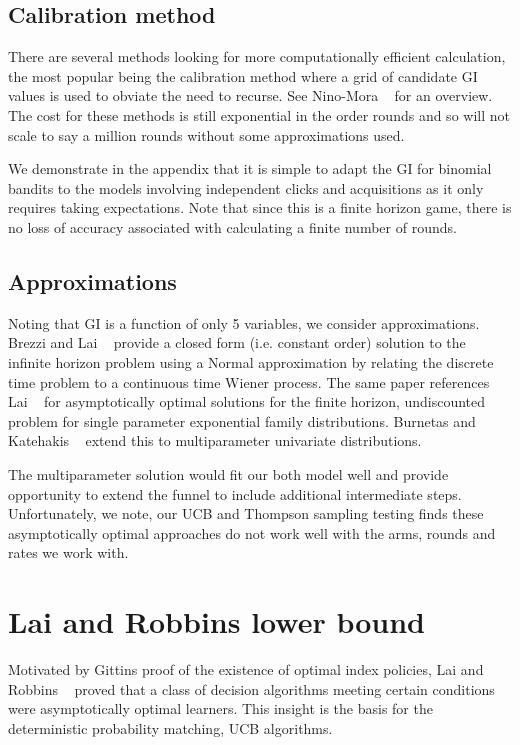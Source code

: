 \documentclass[11pt,a4,singlespacing,titlepagenumber=on]{scrreprt}
\numberwithin{equation}{chapter} %
\theoremstyle{remark}
\begin{document}
\subsection{ Calibration method }

There are several methods looking for more computationally efficient calculation, the most popular being the calibration method where a grid of candidate GI values is used to obviate the need to recurse. See Nino-Mora ~\cite{nino2011computing} for an overview. The cost for these methods is still exponential in the order rounds and so will not scale to say a million rounds without some approximations used.

We demonstrate in the appendix that it is simple to adapt the GI for binomial bandits to the models involving independent clicks and acquisitions as it only requires taking expectations. Note that since this is a finite horizon game, there is no loss of accuracy associated with calculating a finite number of rounds.

\subsection{ Approximations }

Noting that GI is a function of only 5 variables, we consider approximations. Brezzi and Lai ~\cite{brezzi2002optimal} provide a closed form (i.e. constant order) solution to the infinite horizon problem using a Normal approximation by relating the discrete time problem to a continuous time Wiener process.  The same paper references Lai ~\cite{lai1987adaptive} for asymptotically optimal solutions for the finite horizon, undiscounted problem for single parameter exponential family distributions. Burnetas and Katehakis ~\cite{burnetas1996optimal} extend this to multiparameter univariate distributions.

The multiparameter solution would fit our both model well and provide opportunity to extend the funnel to include additional intermediate steps. Unfortunately, we note, our UCB and Thompson sampling testing finds these asymptotically optimal approaches do not work well with the arms, rounds and rates we work with.

\section{ Lai and Robbins lower bound }

Motivated by Gittins proof of the existence of optimal index policies, Lai and Robbins ~\cite{lai1985asymptotically} proved that a class of decision algorithms meeting certain conditions were asymptotically optimal learners. This insight is the basis for the deterministic probability matching, UCB algorithms. 
\end{document}
